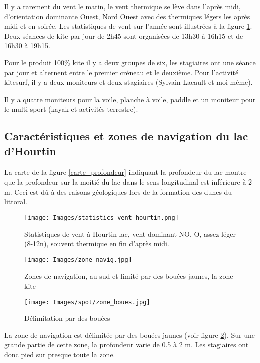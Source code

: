 \documentclass[11pt,a4paper]{report}
\begin{document}
Il y a rarement du vent le matin, le vent thermique se lève dans
l'après midi, d'orientation dominante Ouest, Nord Ouest avec des
thermiques légers les après midi et  en soirée. Les statistiques
de vent sur l'année sont illustrées à la figure \ref{vent_stats}.
Deux séances de kite par jour de 2h45 sont organisées de
13h30 à 16h15 et de 16h30 à 19h15. 

Pour le produit 100\;\% kite il y a deux groupes de six, les stagiaires ont
une séance par jour et alternent entre le premier créneau et le deuxième.
Pour l'activité kitesurf, il y a deux moniteurs et deux stagiaires
(Sylvain Lacault et moi m\^eme).

Il y a quatre moniteurs pour la voile, planche à voile, paddle et un moniteur 
pour le multi sport (kayak et activités terrestre).

\subsection{Caractéristiques  et zones de navigation du lac d'Hourtin}

La carte de la figure \ref{carte_profondeur} indiquant la 
profondeur du lac montre que la profondeur sur la moitié du lac
dans le sens longitudinal est inférieure à 2 m. 
Ceci est d\^u à des raisons géologiques lors de la
formation des dunes du littoral.
\begin{figure}
\centering
\texttt{[image: Images/statistics\_vent\_hourtin.png]} 
\caption{Statistiques de vent à Hourtin lac, vent dominant NO, O, assez léger (8-12n), 
souvent thermique en fin d'après midi.\label{vent_stats}}
\end{figure}

\begin{figure}
\begin{minipage}{0.4\textwidth}
\texttt{[image: Images/zone\_navig.jpg]}
\caption{Zones de navigation, au sud et limité par des bouées jaunes,
la zone kite\label{zones_nav}} 
\end{minipage}
\hfill
\begin{minipage}{0.4\textwidth}
\texttt{[image: Images/spot/zone\_boues.jpg]}
\caption{Délimitation par des bouées\label{boue}}
\end{minipage}
\end{figure}
La zone de navigation est délimitée par des bouées jaunes (voir figure \ref{boue}). 
Sur une grande partie de cette zone, la profondeur varie de 0.5 à 2 m.
Les stagiaires ont donc pied sur presque toute la zone.
\end{document}
